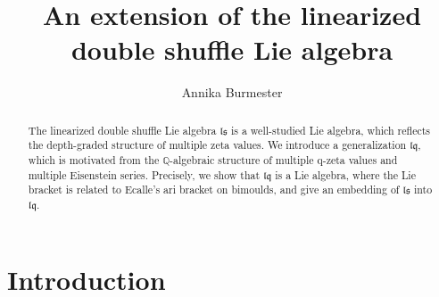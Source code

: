 \documentclass[12pt,reqno]{amsart}
\title{An extension of the linearized double shuffle Lie algebra}
\author{Annika Burmester}
\numberwithin{equation}{section}
\theoremstyle{definition}
\newcommand{\ls}{\mathfrak{ls}}
\newcommand{\lqq}{\mathfrak{lq}}
\begin{document}
	\maketitle
\begin{abstract}
The linearized double shuffle Lie algebra $\ls$ is a well-studied Lie algebra, which reflects the depth-graded structure of multiple zeta values. We introduce a generalization $\lqq$, which is motivated from the $\mathbb{Q}$-algebraic structure of multiple q-zeta values and multiple Eisenstein series. Precisely, we show that $\lqq$ is a Lie algebra, where the Lie bracket is related to Ecalle's ari bracket on bimoulds, and give an embedding of $\ls$ into $\lqq$.
\end{abstract}

\section{Introduction}
	
\end{document}
